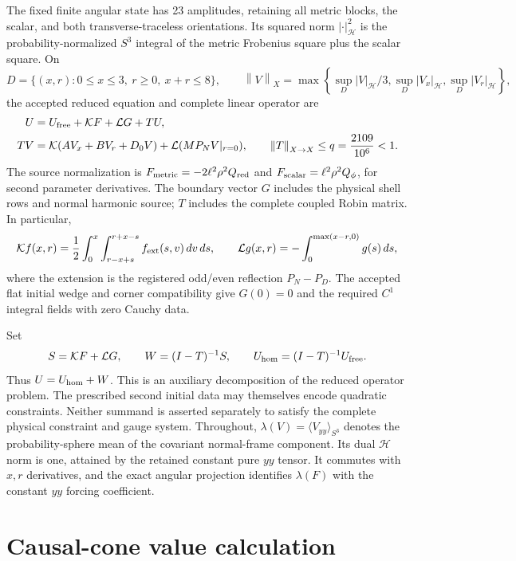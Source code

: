 \documentclass[11pt]{article}
\newcommand{\HH}{\mathcal H}
\newcommand{\KK}{\mathcal K}
\newcommand{\LL}{\mathcal L}
\newcommand{\norm}[1]{\left\lVert#1\right\rVert}
\begin{document}
The fixed finite angular state has 23 amplitudes, retaining all metric blocks,
the scalar, and both transverse-traceless orientations. Its squared norm
$|\cdot|_{\HH}^2$ is the probability-normalized $S^3$ integral of the metric
Frobenius square plus the scalar square. On
\[
 D=\{(x,r):0\le x\le3,\ r\ge0,\ x+r\le8\},
 \qquad
 \norm{V}_X=\max\left\{\sup_D|V|_{\HH}/3,
                         \sup_D|V_x|_{\HH},\sup_D|V_r|_{\HH}\right\},
\]
the accepted reduced equation and complete linear operator are
\begin{align}
 U&=U_{\rm free}+\KK F+\LL G+TU,\\
 TV&=\KK(AV_x+BV_r+D_0V)+\LL(MP_NV|_{r=0}),
 \qquad \norm{T}_{X\to X}\le q=\frac{2109}{10^6}<1.
\end{align}
The source normalization is $F_{\rm metric}=-2\ell^2\rho^2Q_{\rm red}$ and
$F_{\rm scalar}=\ell^2\rho^2Q_\phi$, for second parameter derivatives.
The boundary vector $G$ includes the physical shell rows and normal harmonic
source; $T$ includes the complete coupled Robin matrix. In particular,
\[
 \KK f(x,r)=\frac12\int_0^x\int_{r-x+s}^{r+x-s}
                    f_{\rm ext}(s,v)\,dv\,ds,
 \qquad
 \LL g(x,r)=-\int_0^{\max(x-r,0)}g(s)\,ds,
\]
where the extension is the registered odd/even reflection $P_N-P_D$.
The accepted flat initial wedge and corner compatibility give $G(0)=0$
and the required $C^1$ integral fields with zero Cauchy data.

Set
\[
 S=\KK F+\LL G,\qquad W=(I-T)^{-1}S,
 \qquad U_{\rm hom}=(I-T)^{-1}U_{\rm free}.
\]
Thus $U=U_{\rm hom}+W$. This is an auxiliary decomposition of the reduced
operator problem. The prescribed second initial data may themselves encode
quadratic constraints. Neither summand is asserted separately to satisfy the
complete physical constraint and gauge system.
Throughout, $\lambda(V)=\langle V_{yy}\rangle_{S^3}$ denotes the
probability-sphere mean of the covariant normal-frame component. Its dual
$\HH$ norm is one, attained by the retained constant pure $yy$ tensor.
It commutes with $x,r$ derivatives, and the exact angular projection identifies
$\lambda(F)$ with the constant $yy$ forcing coefficient.

\section{Causal-cone value calculation}

\end{document}
